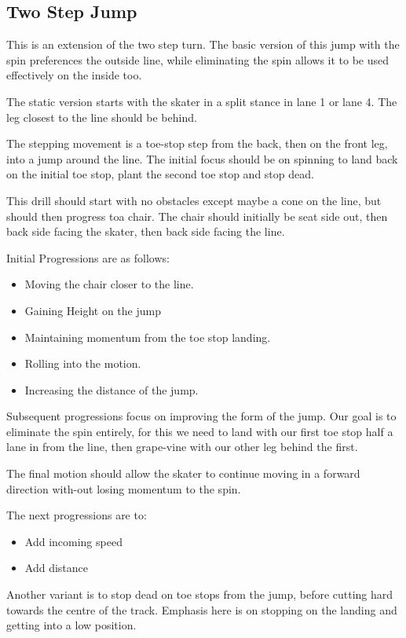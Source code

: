 \subsection{Two Step Jump}

This is an extension of the two step turn. 
The basic version of this jump with the spin preferences the outside line, while eliminating the spin allows it to be used effectively on the inside too.   

The static version starts with the skater in a split stance in lane 1 or lane 4.   
The leg closest to the line should be behind.


The stepping movement is a toe-stop step from the back, then on the front leg, into a jump around the line. 
The initial focus should be on spinning to land back on the initial toe stop, plant the second toe stop and stop dead.

This drill should start with no obstacles except maybe a cone on the line, but should then progress toa chair. 
The chair should initially be seat side out, then back side facing the skater, then back side facing the line.  

Initial Progressions are as follows:
\begin{itemize}
\item Moving the chair closer to the line.
\item Gaining Height on the jump
\item Maintaining momentum from the toe stop landing. 
\item Rolling into the motion.
\item Increasing the distance of the jump.
\end{itemize}

Subsequent progressions focus on improving the form of the jump.
Our goal is to eliminate the spin entirely, for this we need to land with our first toe stop half a lane in from the line, then grape-vine with our other leg behind the first.       

The final motion should allow the skater to continue moving in a forward direction with-out losing momentum to the spin.   

The next progressions are to:

\begin{itemize}
\item Add incoming speed
\item Add distance   
\end{itemize}

Another variant is to stop dead on toe stops from the jump, before cutting hard towards the centre of the track.
Emphasis here is on stopping on the landing and getting into a low position. 
